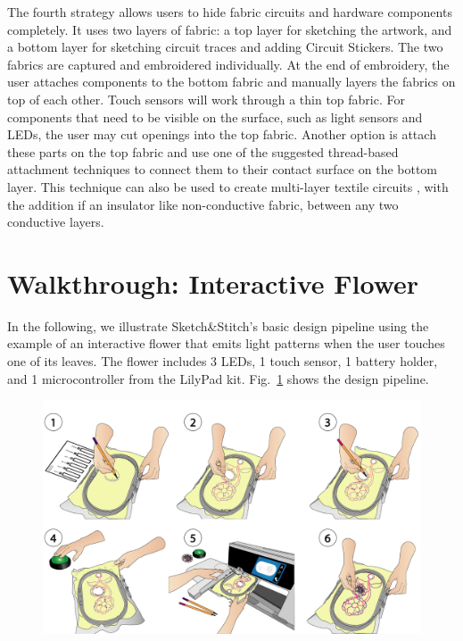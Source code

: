 \documentclass[header.tex]{subfiles}
\begin{document}
The fourth strategy allows users to hide fabric circuits and hardware components completely. It uses two layers of fabric: a top layer for sketching the artwork, and a bottom layer for sketching circuit traces and adding Circuit Stickers. The two fabrics are captured and embroidered individually. At the end of embroidery, the user attaches components to the bottom fabric and manually layers the fabrics on top of each other. Touch sensors will work through a thin top fabric. For components that need to be visible on the surface, such as light sensors and LEDs, the user may cut openings into the top fabric. Another option is attach these parts on the top fabric and use one of the suggested thread-based attachment techniques to connect them to their contact surface on the bottom layer. This technique can also be used to create multi-layer textile circuits \cite{Dunne:2012:MEC:2370216.2370348, 5387040}, with the addition if an insulator like non-conductive fabric, between any two conductive layers. 







\section{Walkthrough: Interactive Flower}


In the following, we illustrate Sketch\&Stitch's basic design pipeline using the example of an interactive flower that emits light patterns when the user touches one of its leaves. The flower includes 3 LEDs, 1 touch sensor, 1 battery holder, and 1 microcontroller 
from the LilyPad kit. Fig.\ \ref{fig:Walkthrough} shows the design pipeline.

\begin{figure} [h!]
\centering
  \includegraphics[width=0.9\columnwidth]{figures/Walkthrough}
  \caption{}~\label{fig:Walkthrough}
  \vspace{-2.5em}
\end{figure}
\end{document}
